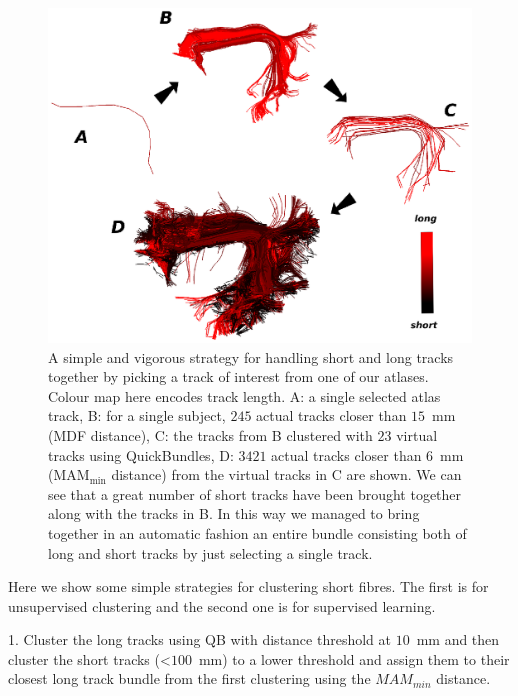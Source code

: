 \documentclass{bioinfo}
\begin{document}
%
\begin{figure}
\begin{centering}
\includegraphics[scale=0.65]{Figures/Fig_10_arcuate_small_fibers}
\par\end{centering}
\caption{A simple and vigorous strategy for handling short and long
  tracks together by picking a track of interest from one of our
  atlases. Colour map here encodes track length. A: a single selected
  atlas track, B: for a single subject, $245$ actual tracks closer than
  $15$~mm (MDF distance), C: the tracks from B clustered with $23$
  virtual tracks using QuickBundles, D: $\num{3421}$ actual tracks closer than $6$~mm
  ($\textrm{MAM}_{\textrm{min}}$ distance) from the virtual tracks in C
  are shown. We can see that a great number of short tracks have been
  brought together along with the tracks in B. In this way we managed to
  bring together in an automatic fashion an entire bundle consisting both of long and short
  tracks by just selecting a single track.\label{Flo:arcuate_close}}
\end{figure}

Here we show some simple strategies for clustering short fibres. The first
is for unsupervised clustering and the second one is for supervised
learning.

1. Cluster the long tracks using QB with distance
threshold at $10$~mm and then cluster the short tracks (<$100$~mm) to a
lower threshold and assign them to their closest long track bundle from
the first clustering using the $MAM_{min}$ distance.
\end{document}
